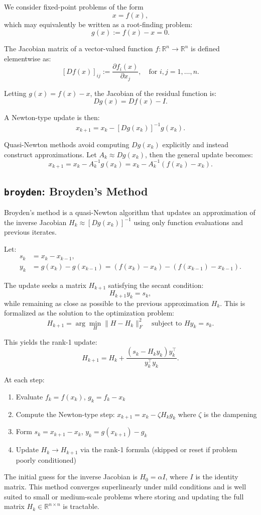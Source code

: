 \documentclass[a4paper,12pt]{article}
\newcommand{\code}[1]{\texttt{#1}}
\begin{document}
We consider fixed-point problems of the form
\[
x = f(x),
\]
which may equivalently be written as a root-finding problem:
\[
g(x) := f(x) - x = 0.
\]

The Jacobian matrix of a vector-valued function \( f : \mathbb{R}^n \to \mathbb{R}^n \) is defined elementwise as:
\[
[D f(x)]_{ij} := \frac{\partial f_i(x)}{\partial x_j}, \quad \text{for } i,j = 1, \dots, n.
\]

Letting \( g(x) = f(x) - x \), the Jacobian of the residual function is:
\[
Dg(x) = Df(x) - I.
\]

A Newton-type update is then:
\[
x_{k+1} = x_k - [Dg(x_k)]^{-1} g(x_k).
\]

Quasi-Newton methods avoid computing \( Dg(x_k) \) explicitly and instead construct approximations. Let \( A_k \approx Dg(x_k) \), then the general update becomes:
\[
x_{k+1} = x_k - A_k^{-1} g(x_k) = x_k - A_k^{-1} (f(x_k) - x_k).
\]

\subsection{\code{broyden}: Broyden's Method}

Broyden's method is a quasi-Newton algorithm that updates an approximation of the inverse Jacobian \( H_k \approx [Dg(x_k)]^{-1} \) using only function evaluations and previous iterates.

Let:
\begin{align*}
s_k &= x_k - x_{k-1}, \\
y_k &= g(x_k) - g(x_{k-1}) = (f(x_k) - x_k) - (f(x_{k-1}) - x_{k-1}).
\end{align*}

The update seeks a matrix \( H_{k+1} \) satisfying the secant condition:
\[
H_{k+1} y_k = s_k,
\]
while remaining as close as possible to the previous approximation \( H_k \). This is formalized as the solution to the optimization problem:
\[
H_{k+1} = \arg\min_H \| H - H_k \|_F^2 \quad \text{subject to } H y_k = s_k.
\]

This yields the rank-1 update:
\[
H_{k+1} = H_k + \frac{(s_k - H_k y_k) y_k^\top}{y_k^\top y_k}.
\]

At each step:
\begin{enumerate}[label=(\roman*)]
    \item Evaluate \( f_k = f(x_k) \), \( g_k = f_k - x_k \)
    \item Compute the Newton-type step: \( x_{k+1} = x_k - \zeta H_k g_k \) where $\zeta$ is the dampening
    \item Form \( s_k = x_{k+1} - x_k \), \( y_k = g(x_{k+1}) - g_k \)
    \item Update \( H_k \to H_{k+1} \) via the rank-1 formula (skipped or reset if problem poorly conditioned)
\end{enumerate}
The initial guess for the inverse Jacobian is $H_0 = \alpha I$, where $I$ is the identity matrix. This method converges superlinearly under mild conditions and is well suited to small or medium-scale problems where storing and updating the full matrix \( H_k \in \mathbb{R}^{n \times n} \) is tractable.
\end{document}
